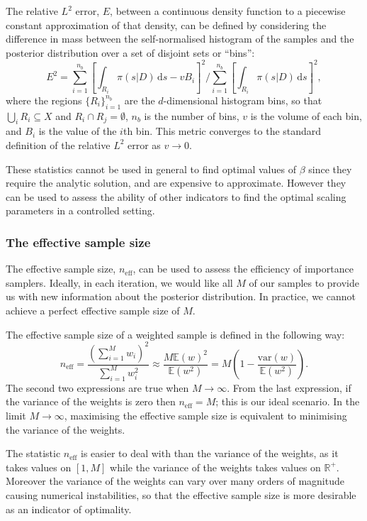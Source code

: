 \documentclass[final]{siamltex}
\newcommand{\neff}{n_{\text{eff}}}
\newcommand{\E}{{\mathbb E}}
\begin{document}
The relative $L^2$ error, $E$, between a continuous density function to a
piecewise constant approximation of that density, can be defined by considering the
difference in mass between the self-normalised histogram of the
samples and the posterior distribution over a set of disjoint sets or
``bins'':
\begin{equation}\label{eqn:L2_error}
	E^2 = \sum\limits_{i=1}^{n_b}\left[\displaystyle\int_{R_i} \! \pi(s|D) \, \mbox{d}s - vB_i\right]^2 \Big/ \sum\limits_{i=1}^{n_b}\left[\displaystyle\int_{R_i} \! \pi(s|D) \, \mbox{d}s\right]^2,
\end{equation}
where the regions $\{R_i\}_{i=1}^{n_b}$ are the $d$-dimensional
histogram bins, so that $\bigcup_i R_i \subseteq X$ and
$R_i\cap R_j=\emptyset$, $n_b$ is the number of bins, $v$ is the
volume of each bin, and $B_i$ is the value of the $i$th bin. This
metric converges to the standard definition of the relative $L^2$
error as $v\rightarrow 0$.

These statistics cannot be used in general to find optimal values of
$\beta$ since they require the analytic solution, and are expensive to
approximate. However they can be used to assess the ability of other
indicators to find the optimal scaling parameters in a controlled
setting.


\subsubsection{The effective sample size}\label{sec:ess}

The effective sample size, $\neff$, can be used to assess the
efficiency of importance samplers. Ideally, in each iteration, we
would like all $M$ of our samples to provide us with new information
about the posterior distribution. In practice, we cannot achieve a
perfect effective sample size of $M$.

The effective sample size of a weighted sample is defined in the
following way:
\[
	\neff = \frac{\left(\sum_{i=1}^M \! w_i\right)^2}{\sum_{i=1}^M \! w_i^2} \approx \frac{M\E(w)^2}{\E(w^2)} = M\left(1 - \frac{\mbox{var}(w)}{\mathbb{E}(w^2)}\right).
\]
The second two expressions are true when $M\rightarrow\infty$. From
the last expression, if the variance of the weights is zero then
$\neff = M$; this is our ideal scenario. In the limit
$M\rightarrow\infty$, maximising the effective
sample size is equivalent to minimising the variance of the weights.

The statistic $\neff$ is easier to deal with than the variance of the
weights, as it takes values on $[1, M]$ while the variance of the
weights takes values on $\mathbb{R}^+$. Moreover the variance of
the weights can vary
over many orders of magnitude causing numerical instabilities, so that the effective
sample size is more desirable as an indicator of optimality.
\end{document}
